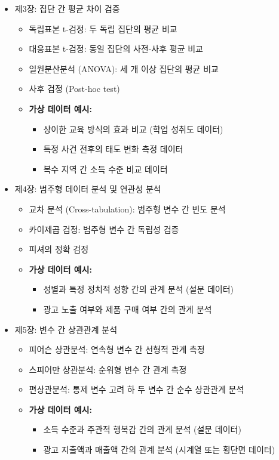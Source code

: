 \documentclass[
  letterpaper,
]{book}
\providecommand{\tightlist}{%
  \setlength{\itemsep}{0pt}\setlength{\parskip}{0pt}}
\begin{document}
\begin{itemize}
\tightlist
\item
  제3장: 집단 간 평균 차이 검증

  \begin{itemize}
  \tightlist
  \item
    독립표본 t-검정: 두 독립 집단의 평균 비교
  \item
    대응표본 t-검정: 동일 집단의 사전-사후 평균 비교
  \item
    일원분산분석 (ANOVA): 세 개 이상 집단의 평균 비교
  \item
    사후 검정 (Post-hoc test)
  \item
    \textbf{가상 데이터 예시:}

    \begin{itemize}
    \tightlist
    \item
      상이한 교육 방식의 효과 비교 (학업 성취도 데이터)
    \item
      특정 사건 전후의 태도 변화 측정 데이터
    \item
      복수 지역 간 소득 수준 비교 데이터
    \end{itemize}
  \end{itemize}
\item
  제4장: 범주형 데이터 분석 및 연관성 분석

  \begin{itemize}
  \tightlist
  \item
    교차 분석 (Cross-tabulation): 범주형 변수 간 빈도 분석
  \item
    카이제곱 검정: 범주형 변수 간 독립성 검증
  \item
    피셔의 정확 검정
  \item
    \textbf{가상 데이터 예시:}

    \begin{itemize}
    \tightlist
    \item
      성별과 특정 정치적 성향 간의 관계 분석 (설문 데이터)
    \item
      광고 노출 여부와 제품 구매 여부 간의 관계 분석
    \end{itemize}
  \end{itemize}
\item
  제5장: 변수 간 상관관계 분석

  \begin{itemize}
  \tightlist
  \item
    피어슨 상관분석: 연속형 변수 간 선형적 관계 측정
  \item
    스피어만 상관분석: 순위형 변수 간 관계 측정
  \item
    편상관분석: 통제 변수 고려 하 두 변수 간 순수 상관관계 분석
  \item
    \textbf{가상 데이터 예시:}

    \begin{itemize}
    \tightlist
    \item
      소득 수준과 주관적 행복감 간의 관계 분석 (설문 데이터)
    \item
      광고 지출액과 매출액 간의 관계 분석 (시계열 또는 횡단면 데이터)
    \end{itemize}
  \end{itemize}
\end{itemize}
\end{document}
